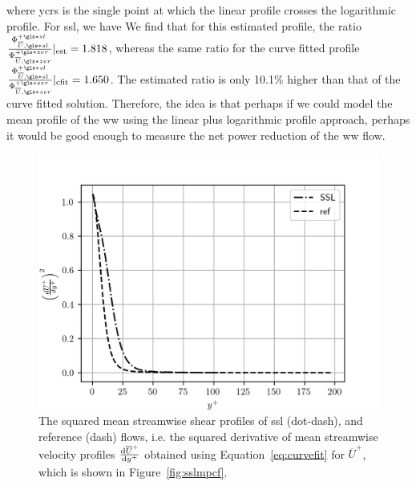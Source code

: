 where \gls*{ycrs} is the single point at which the linear profile crosses the logarithmic profile. For \gls{ssl}, we have We find that for this estimated profile, the ratio $\frac{\Phi _{\overline{U},\gls*{sl}}\ps}{\Phi _{\overline{U},\gls*{zer}}\pz}\rvert_\text{est}=1.818$, whereas the same ratio for the curve fitted profile $\frac{\Phi _{\overline{U},\gls*{sl}}\ps}{\Phi _{\overline{U},\gls*{zer}}\pz}\rvert_\text{cfit}=1.650$. The estimated ratio is only 10.1\% higher than that of the curve fitted solution. Therefore, the idea is that perhaps if we could model the mean profile of the \gls{ww} using the linear plus logarithmic profile approach, perhaps it would be good enough to measure the net power reduction of the \gls{ww} flow.
\begin{figure}[htbp]
	\centering
	\includegraphics[width=0.7\linewidth]{project/fig/sslmeandiff.png}
	\caption[Mean streamwise shear profile squared of SSL and reference flows]{The squared mean streamwise shear profiles of \gls{ssl} (dot-dash), and reference (dash) flows, i.e. the squared derivative of mean streamwise velocity profiles $\dv{\overline{U}^{+}}{y^{+}} $ obtained using Equation~\eqref{eq:curvefit} for $\overline{U}^{+}$, which is shown in Figure~\ref{fig:sslmpcf}.}
	\label{fig:sslmpdiff}
\end{figure}

